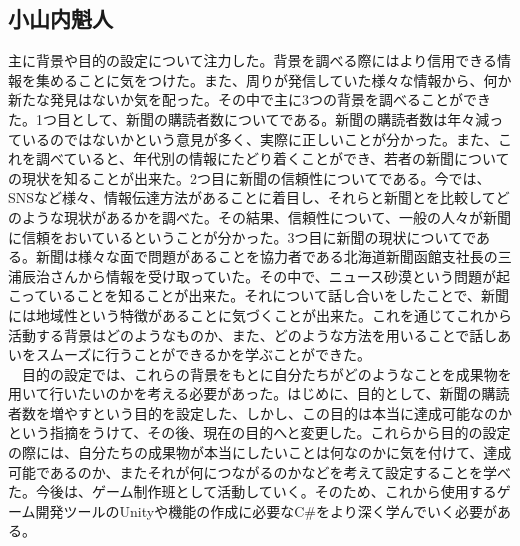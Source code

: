\subsection{小山内魁人}
主に背景や目的の設定について注力した。背景を調べる際にはより信用できる情報を集めることに気をつけた。また、周りが発信していた様々な情報から、何か新たな発見はないか気を配った。その中で主に3つの背景を調べることができた。1つ目として、新聞の購読者数についてである。新聞の購読者数は年々減っているのではないかという意見が多く、実際に正しいことが分かった。また、これを調べていると、年代別の情報にたどり着くことができ、若者の新聞についての現状を知ることが出来た。2つ目に新聞の信頼性についてである。今では、SNSなど様々、情報伝達方法があることに着目し、それらと新聞とを比較してどのような現状があるかを調べた。その結果、信頼性について、一般の人々が新聞に信頼をおいているということが分かった。3つ目に新聞の現状についてである。新聞は様々な面で問題があることを協力者である北海道新聞函館支社長の三浦辰治さんから情報を受け取っていた。その中で、ニュース砂漠という問題が起こっていることを知ることが出来た。それについて話し合いをしたことで、新聞には地域性という特徴があることに気づくことが出来た。これを通じてこれから活動する背景はどのようなものか、また、どのような方法を用いることで話しあいをスムーズに行うことができるかを学ぶことができた。\\
　目的の設定では、これらの背景をもとに自分たちがどのようなことを成果物を用いて行いたいのかを考える必要があった。はじめに、目的として、新聞の購読者数を増やすという目的を設定した、しかし、この目的は本当に達成可能なのかという指摘をうけて、その後、現在の目的へと変更した。これらから目的の設定の際には、自分たちの成果物が本当にしたいことは何なのかに気を付けて、達成可能であるのか、またそれが何につながるのかなどを考えて設定することを学べた。今後は、ゲーム制作班として活動していく。そのため、これから使用するゲーム開発ツールのUnityや機能の作成に必要なC\#をより深く学んでいく必要がある。


